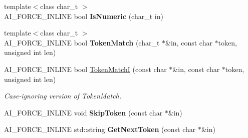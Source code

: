 \begin{DoxyCompactItemize}
\item 
\hypertarget{namespace_assimp_a66776110eb3e45aecf16baebd71ca713}{{\footnotesize template$<$class char\+\_\+t $>$ }\\A\+I\+\_\+\+F\+O\+R\+C\+E\+\_\+\+I\+N\+L\+I\+N\+E bool {\bfseries Is\+Numeric} (char\+\_\+t in)}\label{namespace_assimp_a66776110eb3e45aecf16baebd71ca713}

\item 
\hypertarget{namespace_assimp_ae4567ff539c9f9fc2b63598edbd3d4be}{{\footnotesize template$<$class char\+\_\+t $>$ }\\A\+I\+\_\+\+F\+O\+R\+C\+E\+\_\+\+I\+N\+L\+I\+N\+E bool {\bfseries Token\+Match} (char\+\_\+t $\ast$\&in, const char $\ast$token, unsigned int len)}\label{namespace_assimp_ae4567ff539c9f9fc2b63598edbd3d4be}

\item 
A\+I\+\_\+\+F\+O\+R\+C\+E\+\_\+\+I\+N\+L\+I\+N\+E bool \hyperlink{namespace_assimp_a3bd333f65bd8da9590190ed27987e47f}{Token\+Match\+I} (const char $\ast$\&in, const char $\ast$token, unsigned int len)
\begin{DoxyCompactList}\small\item\em Case-\/ignoring version of Token\+Match. \end{DoxyCompactList}\item 
\hypertarget{namespace_assimp_afcdf7e2568e40907cea2f7025b0a76a3}{A\+I\+\_\+\+F\+O\+R\+C\+E\+\_\+\+I\+N\+L\+I\+N\+E void {\bfseries Skip\+Token} (const char $\ast$\&in)}\label{namespace_assimp_afcdf7e2568e40907cea2f7025b0a76a3}

\item 
\hypertarget{namespace_assimp_a6dc54015f5b7ec09336559345d8bec9b}{A\+I\+\_\+\+F\+O\+R\+C\+E\+\_\+\+I\+N\+L\+I\+N\+E std\+::string {\bfseries Get\+Next\+Token} (const char $\ast$\&in)}\label{namespace_assimp_a6dc54015f5b7ec09336559345d8bec9b}


\end{DoxyCompactItemize}
